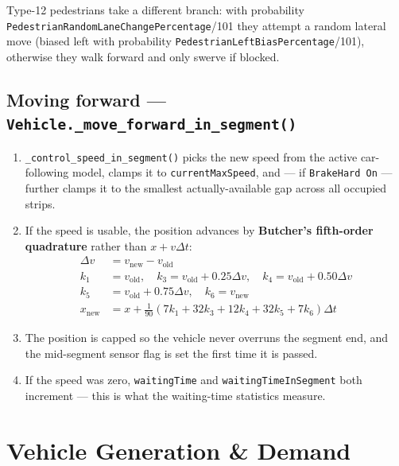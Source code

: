 \documentclass[11pt, a4paper]{article}
\newcommand{\code}[1]{\texttt{#1}}
\begin{document}
Type-12 pedestrians take a different branch: with probability
\code{PedestrianRandomLaneChangePercentage}/101 they attempt a random lateral
move (biased left with probability \code{PedestrianLeftBiasPercentage}/101),
otherwise they walk forward and only swerve if blocked.

\subsection{Moving forward --- \code{Vehicle.\_move\_forward\_in\_segment()}}

\begin{enumerate}
    \item \code{\_control\_speed\_in\_segment()} picks the new speed from the
          active car-following model, clamps it to \code{currentMaxSpeed}, and
          --- if \code{BrakeHard On} --- further clamps it to the smallest
          actually-available gap across all occupied strips.
    \item If the speed is usable, the position advances by \textbf{Butcher's
          fifth-order quadrature} rather than $x + v\Delta t$:
    \begin{align*}
        \Delta v &= v_{\text{new}} - v_{\text{old}} \\
        k_1 &= v_{\text{old}}, \quad
        k_3 = v_{\text{old}} + 0.25\Delta v, \quad
        k_4 = v_{\text{old}} + 0.50\Delta v \\
        k_5 &= v_{\text{old}} + 0.75\Delta v, \quad
        k_6 = v_{\text{new}} \\
        x_{\text{new}} &= x + \tfrac{1}{90}\left(7k_1 + 32k_3 + 12k_4 + 32k_5 + 7k_6\right)\Delta t
    \end{align*}
    \item The position is capped so the vehicle never overruns the segment end,
          and the mid-segment sensor flag is set the first time it is passed.
    \item If the speed was zero, \code{waitingTime} and
          \code{waitingTimeInSegment} both increment --- this is what the
          waiting-time statistics measure.
\end{enumerate}

\section{Vehicle Generation \& Demand}
\label{sec:demand}
\end{document}
